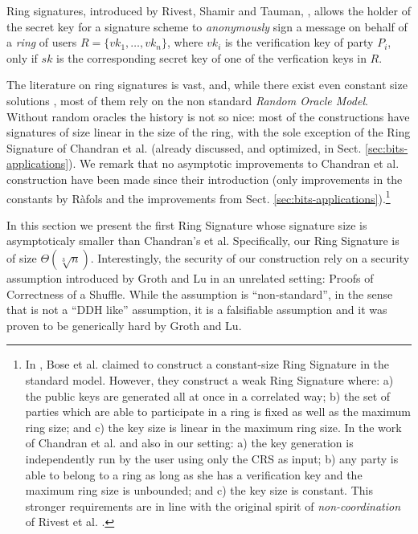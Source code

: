 Ring signatures, introduced by Rivest, Shamir and Tauman, \cite{AC:RivShaTau01}, allows the holder of the secret key for a signature scheme to \emph{anonymously} sign a message on behalf of a \emph{ring} of users $R=\{vk_1,\ldots,vk_n\}$, where $vk_i$ is the verification key of party $P_i$, only if $sk$ is the corresponding secret key of one of the verfication keys in $R$.

The literature on ring signatures is vast, and, while there exist even constant size solutions \cite{EC:DKNS04}, most of them rely on the non standard \emph{Random Oracle Model}. Without random oracles the history is not so nice: most of the constructions have signatures of size linear in the size of the ring, with the sole exception of the Ring Signature of Chandran et al. \cite{ICALP:ChaGroSah07} (already discussed, and optimized, in Sect. \ref{sec:bits-applications}). We remark that no asymptotic improvements to Chandran et al. construction have been made since their introduction (only improvements in the constants by R\`afols \cite{TCC:Rafols15} and the improvements from Sect. \ref{sec:bits-applications}).\footnote{In \cite{ACISP:BosDasRan15}, Bose et al. claimed to construct a constant-size Ring Signature in the standard model. However, they construct a weak Ring Signature where: a) the public keys are generated all at once in a correlated way; b) the set of parties which are able to participate in a ring is fixed as well as the maximum ring size; and c) the key size is linear in the maximum ring size. In the work of Chandran et al. and also in our setting: a) the key generation is independently run by the user using only the CRS as input; b) any party is able to belong to a ring as long as she has a verification key and the maximum ring size is unbounded; and c) the key size is constant. This stronger requirements are in line with the original spirit of \emph{non-coordination} of  Rivest et al. \cite{AC:RivShaTau01}.}

In this section we present the first Ring Signature whose signature size is asymptoticaly smaller than Chandran's et al. Specifically, our Ring Signature is of size $\Theta(\sqrt[3]{n})$. Interestingly, the security of our construction rely on a security assumption introduced by Groth and Lu \cite{AC:GroLu07} in an unrelated setting: Proofs of Correctness of a Shuffle. While the assumption is ``non-standard'', in the sense that is not a ``DDH like'' assumption, it is a falsifiable assumption and it was proven to be generically hard by Groth and Lu.


